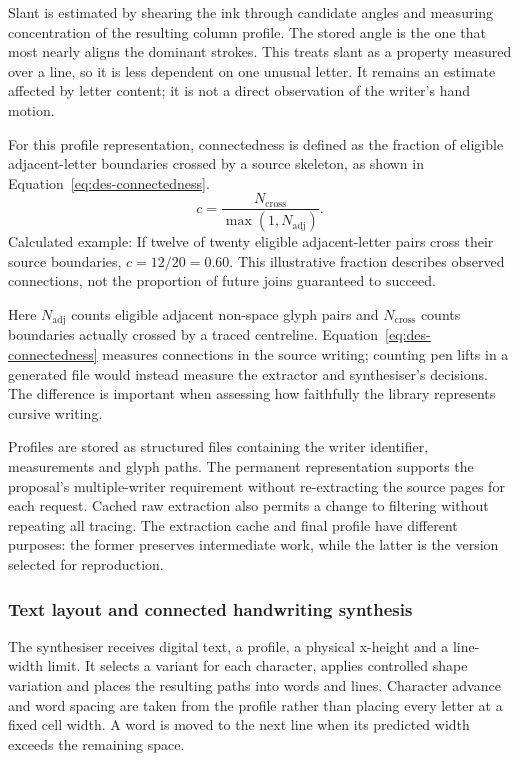Slant is estimated by shearing the ink through candidate angles and measuring concentration of the resulting column profile. The stored angle is the one that most nearly aligns the dominant strokes. This treats slant as a property measured over a line, so it is less dependent on one unusual letter. It remains an estimate affected by letter content; it is not a direct observation of the writer's hand motion.

For this profile representation, connectedness is defined as the fraction of eligible adjacent-letter boundaries crossed by a source skeleton, as shown in Equation~\ref{eq:des-connectedness}.
\begin{equation}
c=\frac{N_{\mathrm{cross}}}{\max(1,N_{\mathrm{adj}})}.
\label{eq:des-connectedness}
\end{equation}
Calculated example: If twelve of twenty eligible adjacent-letter pairs cross their source boundaries, $c=12/20=0.60$. This illustrative fraction describes observed connections, not the proportion of future joins guaranteed to succeed.

Here $N_{\mathrm{adj}}$ counts eligible adjacent non-space glyph pairs and $N_{\mathrm{cross}}$ counts boundaries actually crossed by a traced centreline. Equation~\ref{eq:des-connectedness} measures connections in the source writing; counting pen lifts in a generated file would instead measure the extractor and synthesiser's decisions. The difference is important when assessing how faithfully the library represents cursive writing.

Profiles are stored as structured files containing the writer identifier, measurements and glyph paths. The permanent representation supports the proposal's multiple-writer requirement without re-extracting the source pages for each request. Cached raw extraction also permits a change to filtering without repeating all tracing. The extraction cache and final profile have different purposes: the former preserves intermediate work, while the latter is the version selected for reproduction.

\subsubsection{Text layout and connected handwriting synthesis}
\label{sec:des-layout}
The synthesiser receives digital text, a profile, a physical x-height and a line-width limit. It selects a variant for each character, applies controlled shape variation and places the resulting paths into words and lines. Character advance and word spacing are taken from the profile rather than placing every letter at a fixed cell width. A word is moved to the next line when its predicted width exceeds the remaining space.


